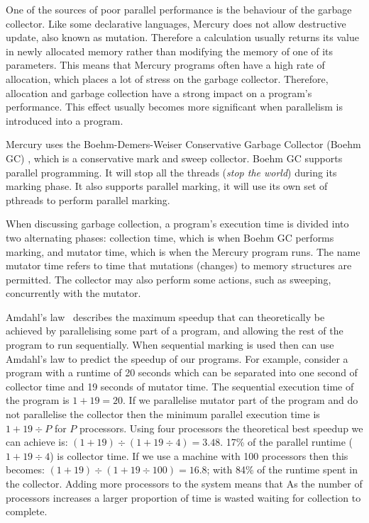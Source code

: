 
One of the sources of poor parallel performance is the behaviour of the
garbage collector.
Like some declarative languages,
Mercury does not allow destructive update, also known as mutation.%
Therefore a calculation usually returns its value in newly allocated memory
rather than modifying the memory of one of its parameters.
This means that Mercury programs often have a high rate of allocation,
which places a lot of stress on the garbage collector.
Therefore,
allocation and garbage collection have a strong impact on a program's
performance.
This effect usually becomes more significant when parallelism is introduced into a
program.

Mercury uses the Boehm-Demers-Weiser Conservative Garbage Collector (Boehm GC)
\citep{boehm_gc},
which is a conservative mark and sweep collector.
Boehm GC supports parallel programming.
It will stop all the threads (\emph{stop the world}) during its marking
phase.
It also supports parallel marking,
it will use its own set of pthreads to perform parallel marking.

When discussing garbage collection,
a program's execution time is divided into two alternating phases:
collection time, which is when Boehm GC performs marking,
and mutator time, which is when the Mercury program runs.
The name mutator time refers to time that mutations (changes) to memory
structures are permitted.
The collector may also perform some actions,
such as sweeping,
concurrently with the mutator.

Amdahl's law~\citep{amdahl} describes the maximum speedup that
can theoretically  be achieved by parallelising some part of a program,
and allowing the rest of the program to run sequentially.
When sequential marking is used then can use Amdahl's
law to predict the speedup of our programs.
For example, consider a program with a runtime of 20 seconds
which can be separated into one second of collector time and 19 seconds
of mutator time.
The sequential execution time of the program is $1 + 19 = 20$.
If we parallelise mutator part of the program and do not parallelise the
collector then the minimum parallel execution time is $1 + 19{\div}P$
for $P$ processors.
Using four processors the theoretical best speedup we can achieve is:
$(1 + 19) \div (1 + 19\div4) = 3.48$.
17\% of the parallel runtime ($1 + 19\div4$) is collector time.
If we use a machine with 100 processors then this becomes:
$(1 + 19) \div (1 + 19\div100) = 16.8$;
with 84\% of the runtime spent in the collector.
Adding more processors to the system means that
As the number of processors increases a larger proportion of time is
wasted waiting for collection to complete.


